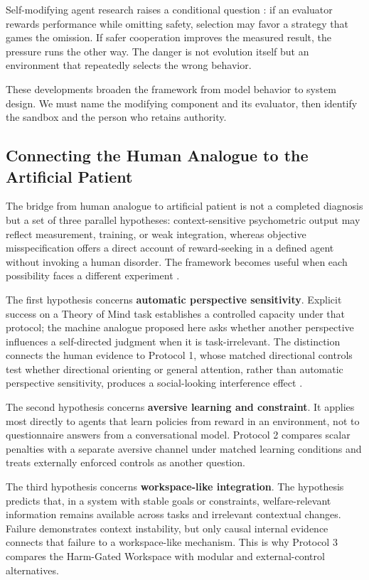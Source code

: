 \documentclass{article}
\begin{document}
Self-modifying agent research raises a conditional question \citep{ref38}: if an evaluator rewards performance while omitting safety, selection may favor a strategy that games the omission. If safer cooperation improves the measured result, the pressure runs the other way. The danger is not evolution itself but an environment that repeatedly selects the wrong behavior.

These developments broaden the framework from model behavior to system design. We must name the modifying component and its evaluator, then identify the sandbox and the person who retains authority.

\subsection{Connecting the Human Analogue to the Artificial Patient}
The bridge from human analogue to artificial patient is not a completed diagnosis but a set of three parallel hypotheses: context-sensitive psychometric output may reflect measurement, training, or weak integration, whereas objective misspecification offers a direct account of reward-seeking in a defined agent without invoking a human disorder. The framework becomes useful when each possibility faces a different experiment \citep{ref3, ref28}.

The first hypothesis concerns \textbf{automatic perspective sensitivity}. Explicit success on a Theory of Mind task establishes a controlled capacity under that protocol; the machine analogue proposed here asks whether another perspective influences a self-directed judgment when it is task-irrelevant. The distinction connects the human evidence to Protocol 1, whose matched directional controls test whether directional orienting or general attention, rather than automatic perspective sensitivity, produces a social-looking interference effect \citep{ref53, ref66, ref68}.

The second hypothesis concerns \textbf{aversive learning and constraint}. It applies most directly to agents that learn policies from reward in an environment, not to questionnaire answers from a conversational model. Protocol 2 compares scalar penalties with a separate aversive channel under matched learning conditions and treats externally enforced controls as another question.

The third hypothesis concerns \textbf{workspace-like integration}. The hypothesis predicts that, in a system with stable goals or constraints, welfare-relevant information remains available across tasks and irrelevant contextual changes. Failure demonstrates context instability, but only causal internal evidence connects that failure to a workspace-like mechanism. This is why Protocol 3 compares the Harm-Gated Workspace with modular and external-control alternatives.
\end{document}
